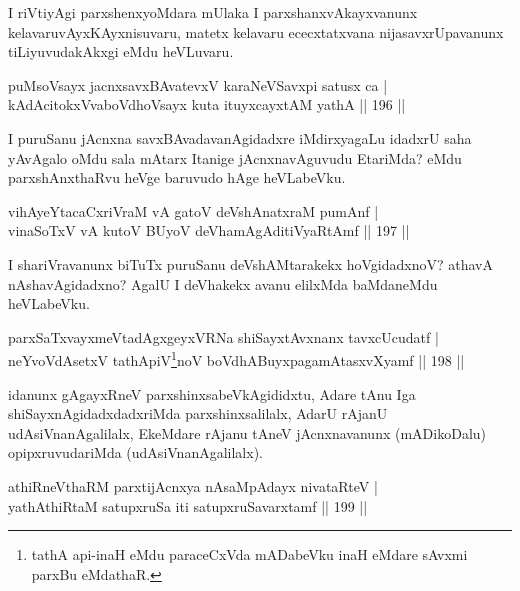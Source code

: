 \begin{artha}
I riVtiyAgi parxshenxyoMdara mUlaka I parxshanxvAkayxvanunx kelavaru\break vAyxKAyxnisuvaru, matetx kelavaru ececxtatxvana nijasavxrUpavanunx tiLiyuvudakAkxgi eMdu heVLuvaru.
\end{artha}

\begin{shl}
puMsoV\s sayx jacnxsavxBAvatevxV karaNeVSavxpi satusx ca |\\
kAdAcitokxV\s vaboVdhoV\s sayx kuta ituyxcayxtAM yathA \hfill || 196 ||
\end{shl}

\begin{artha}
I puruSanu jAcnxna savxBAvadavanAgidadxre iMdirxyagaLu idadxrU saha yAvAgalo oMdu sala mAtarx Itanige jAcnxnavAguvudu EtariMda? eMdu parxshAnxthaRvu heVge baruvudo hAge heVLabeVku.
\end{artha}

\begin{shl}
vihAyeYtacaCxriVraM vA gatoV deVshAnatxraM pumAnf |\\
vinaSoTxV vA kutoV BUyoV deVhamAgAditiVyaRtAmf \hfill || 197 ||
\end{shl}

\begin{artha}
I shariVravanunx biTuTx puruSanu deVshAMtarakekx hoVgidadxnoV? athavA nAshavAgidadxno? AgalU I deVhakekx avanu elilxMda baMdaneMdu heVLabeVku.
\end{artha}

\begin{shl}
parxSaTxvayxmeVtadAgxgeyxVRNa shiSayxtAvxnanx tavxcUcudatf |\\
neYvoVdAsetxV tathA\s piV\footnote{tathA api-inaH eMdu paraceCxVda mADabeVku inaH eMdare sAvxmi parxBu eMdathaR.}noV boVdhABuyxpagamAtasxvXyamf \hfill || 198 ||
\end{shl}

\begin{artha}
idanunx gAgayxRneV parxshinxsabeVkAgididxtu, Adare tAnu Iga shiSayxnAgidadxdadxriMda parxshinxsalilalx, AdarU rAjanU udAsiVnanAgalilalx, EkeMdare rAjanu tAneV jAcnxnavanunx (mADikoDalu) opipxruvudariMda (udAsiVnanAgalilalx).
\end{artha}

\begin{shl}
athiRneV\s thaRM parxtijAcnxya nAsaMpAdayx nivataRteV |\\
yathAthiRtaM satupxruSa  iti satupxruSavarxtamf \hfill || 199 ||
\end{shl}

